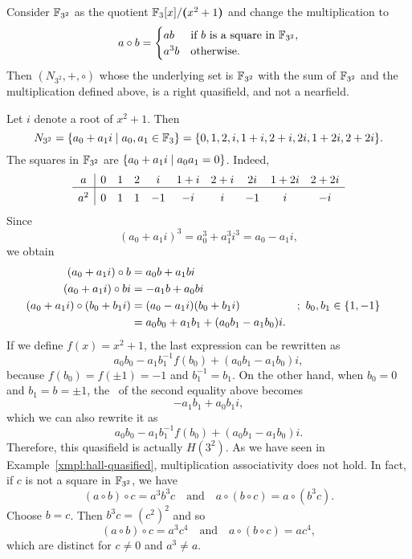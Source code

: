 \begin{xmpl}
    Consider $\Fq[3^2]$ as the quotient $\Fq[3][x]/\gen{x^2+1}$ and change the multiplication to
    \[
        a\circ b=\begin{cases}
            ab      &\text{if $b$ is a square in $\Fq[3^2]$},\\
            a^3b    &\text{otherwise}.
        \end{cases}
    \]
    Then $(N_{3^2},+,\circ)$ whose the underlying set is $\Fq[3^2]$ with the sum of $\Fq[3^2]$ and the multiplication defined above, is a right quasifield, and not a nearfield.

    Let $i$ denote a root of $x^2+1$. Then
    \[
        N_{3^2}=\set{a_0+a_1i\mid a_0,a_1\in\Fq[3]}
            =\set{0,1,2,i,1+i,2+i,2i,1+2i,2+2i}.
    \]
    The squares in $\Fq[3^2]$ are $\set{a_0+a_1i\mid a_0a_1=0}$. Indeed,
    \[
        \begin{array}{c|ccccccccc}
            a&0&1&2&i&1+i&2+i&2i&1+2i&2+2i\\
            \hline\rule{0pt}{12pt}
            a^2&0&1&1&-1&-i&i&-1&i&-i\\
        \end{array}
    \]
    Since
    \[
        (a_0+a_1i)^3= a_0^3+a_1^3i^3=a_0-a_1i,
    \]
    we obtain
    \begin{align*}
        (a_0+a_1i)\circ b &= a_0b + a_1bi\\
        (a_0+a_1i)\circ bi &= -a_1b+a_0bi\\
        (a_0+a_1i)\circ(b_0+b_1i) &= (a_0-a_1i)(b_0+b_1i)
                &&;\ b_0,b_1\in\set{1,-1}\\
            &= a_0b_0+a_1b_1+(a_0b_1-a_1b_0)i.
    \end{align*}
    If we define $f(x)=x^2+1$, the last expression can be rewritten as
    \[
        a_0b_0-a_1b_1^{-1}f(b_0)+(a_0b_1-a_1b_0)i,
    \]
    because $f(b_0)=f(\pm1)=-1$ and $b_1^{-1}=b_1$. On the other hand, when $b_0=0$ and $b_1=b=\pm1$, the \rhs\ of the second equality above becomes
    \[
        -a_1b_1+a_0b_1i,
    \]
    which we can also rewrite it as
    \[
        a_0b_0-a_1b_1^{-1}f(b_0)+(a_0b_1-a_1b_0)i.
    \]
    Therefore, this quasifield is actually $H(3^2)$. As we have seen in Example~\ref{xmpl:hall-quasified}, multiplication associativity does not hold. In fact, if $c$ is not a square in $\Fq[3^2]$, we have
    \[
        (a\circ b)\circ c = a^3b^3c
        \quad\text{and}\quad
        a\circ(b\circ c)=a\circ(b^3c).
    \]
    Choose $b=c$. Then $b^3c=(c^2)^2$ and so
    \[
        (a\circ b)\circ c = a^3c^4
        \quad\text{and}\quad
        a\circ(b\circ c) = ac^4,
    \]
    which are distinct for $c\ne0$ and $a^3\ne a$.
\end{xmpl}

